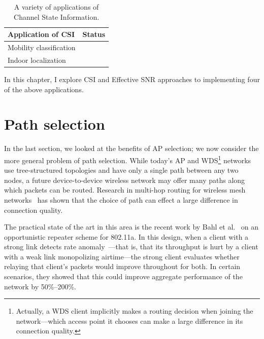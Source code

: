 \begin{table}[htp]
	\centering
	\begin{tabular}{lc}
	\toprule
		\textbf{Application of CSI} & \textbf{Status} \\
	\midrule
		Mobility classification & \secref{sec:esnr_mobility}\\
		Indoor localization & \cite{Sen_PinLoc} \\ 
	\bottomrule
	\end{tabular}
	\caption[A variety of applications of Channel State Information]{\label{tab:csi_uses}A variety of applications of Channel State Information.}
\end{table}

In this chapter, I explore CSI and Effective SNR approaches to implementing four of the above applications.



\section{Path selection}\label{sec:esnr_pathsel}
In the last section, we looked at the benefits of AP selection; we now consider the more general problem of path selection. While today's AP and WDS\footnote{Actually, a WDS client implicitly makes a routing decision when joining the network---which access point it chooses can make a large difference in its connection quality.} networks use tree-structured topologies and have only a single path between any two nodes, a future device-to-device wireless network may offer many paths along which packets can be routed. Research in multi-hop routing for wireless mesh networks~\cite{Bahl_repeater,Rodrig_thesis} has shown that the choice of path can effect a large difference in connection quality.

The practical state of the art in this area is the recent work by Bahl et al.~\cite{Bahl_repeater} on an opportunistic repeater scheme for 802.11a. In this design, when a client with a strong link detects rate anomaly~\cite{Heusse_RateAnomaly}---that is, that its throughput is hurt by a client with a weak link monopolizing airtime---the strong client evaluates whether relaying that client's packets would improve throughout for both. In certain scenarios, they showed that this could improve aggregate performance of the network by 50\%--200\%.

